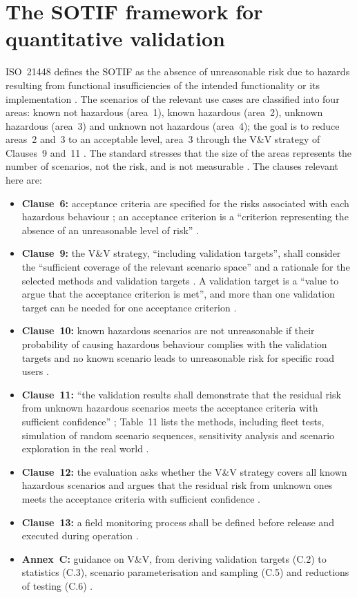 \documentclass[11pt,a4paper]{article}
\begin{document}
\section{The SOTIF framework for quantitative validation}\label{sec:framework}
ISO~21448 defines the SOTIF as the absence of unreasonable risk due to hazards resulting from functional insufficiencies of the intended functionality or its implementation \cite[3.25, p.~8]{iso21448}. The scenarios of the relevant use cases are classified into four areas: known not hazardous (area~1), known hazardous (area~2), unknown hazardous (area~3) and unknown not hazardous (area~4); the goal is to reduce areas~2 and~3 to an acceptable level, area~3 through the V\&V strategy of Clauses~9 and~11 \cite[4.2.2, Figures~5--6, pp.~12--14]{iso21448}. The standard stresses that the size of the areas represents the number of scenarios, not the risk, and is not measurable \cite[4.2.2, Notes~2--3, p.~14]{iso21448}. The clauses relevant here are:
\begin{itemize}
\item \textbf{Clause~6:} acceptance criteria are specified for the risks associated with each hazardous behaviour \cite[6.5, p.~30]{iso21448}; an acceptance criterion is a ``criterion representing the absence of an unreasonable level of risk'' \cite[3.1, p.~2]{iso21448}.
\item \textbf{Clause~9:} the V\&V strategy, ``including validation targets'', shall consider the ``sufficient coverage of the relevant scenario space'' and a rationale for the selected methods and validation targets \cite[9.1~a)--b), p.~42]{iso21448}. A validation target is a ``value to argue that the acceptance criterion is met'', and more than one validation target can be needed for one acceptance criterion \cite[3.33 and Note~3, p.~10]{iso21448}.
\item \textbf{Clause~10:} known hazardous scenarios are not unreasonable if their probability of causing hazardous behaviour complies with the validation targets and no known scenario leads to unreasonable risk for specific road users \cite[10.7, pp.~49--50]{iso21448}.
\item \textbf{Clause~11:} ``the validation results shall demonstrate that the residual risk from unknown hazardous scenarios meets the acceptance criteria with sufficient confidence'' \cite[11.1, p.~50]{iso21448}; Table~11 lists the methods, including fleet tests, simulation of random scenario sequences, sensitivity analysis and scenario exploration in the real world \cite[11.3, Table~11, p.~51]{iso21448}.
\item \textbf{Clause~12:} the evaluation asks whether the V\&V strategy covers all known hazardous scenarios and argues that the residual risk from unknown ones meets the acceptance criteria with sufficient confidence \cite[12.3~c), p.~54]{iso21448}.
\item \textbf{Clause~13:} a field monitoring process shall be defined before release and executed during operation \cite[13.1, p.~55]{iso21448}.
\item \textbf{Annex~C:} guidance on V\&V, from deriving validation targets (C.2) to statistics (C.3), scenario parameterisation and sampling (C.5) and reductions of testing (C.6) \cite[C.1, pp.~125--126]{iso21448}.
\end{itemize}
\end{document}
